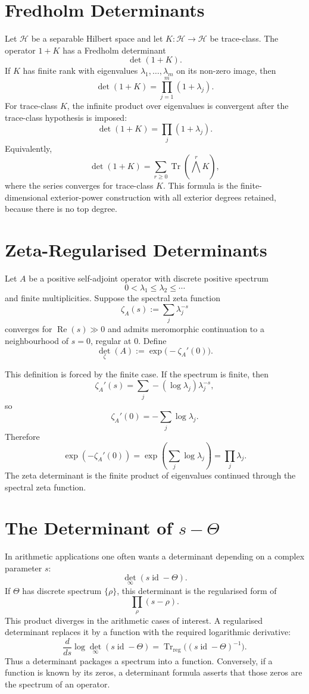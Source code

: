 \documentclass[11pt]{memoir}
\providecommand{\Tr}{\operatorname{Tr}}
\providecommand{\id}{\operatorname{id}}
\providecommand{\cH}{\mathcal{H}}
\begin{document}
\section{Fredholm Determinants}
\label{sec:fredholm}

Let \(\cH\) be a separable Hilbert space and let \(K:\cH\to\cH\) be
trace-class. The operator \(1+K\) has a Fredholm determinant
\[
  \det(1+K).
\]
If \(K\) has finite rank with eigenvalues \(\lambda_1,\dots,\lambda_m\)
on its non-zero image, then
\[
  \det(1+K)=\prod_{j=1}^{m}(1+\lambda_j).
\]
For trace-class \(K\), the infinite product over eigenvalues is
convergent after the trace-class hypothesis is imposed:
\[
  \det(1+K)=\prod_j(1+\lambda_j).
\]
Equivalently,
\[
  \det(1+K)
  =
  \sum_{r\geq0}\Tr\left(\bigwedge^rK\right),
\]
where the series converges for trace-class \(K\). This formula is the
finite-dimensional exterior-power construction with all exterior
degrees retained, because there is no top degree.

\section{Zeta-Regularised Determinants}
\label{sec:zeta-det}

Let \(A\) be a positive self-adjoint operator with discrete positive
spectrum
\[
  0<\lambda_1\leq\lambda_2\leq\cdots
\]
and finite multiplicities. Suppose the spectral zeta function
\[
  \zeta_A(s):=\sum_j\lambda_j^{-s}
\]
converges for \(\operatorname{Re}(s)\gg0\) and admits meromorphic
continuation to a neighbourhood of \(s=0\), regular at \(0\). Define
\[
  \det_\zeta(A):=\exp\bigl(-\zeta_A'(0)\bigr).
\]

This definition is forced by the finite case. If the spectrum is
finite, then
\[
  \zeta_A'(s)=\sum_j -(\log\lambda_j)\lambda_j^{-s},
\]
so
\[
  \zeta_A'(0)=-\sum_j\log\lambda_j.
\]
Therefore
\[
  \exp(-\zeta_A'(0))
  =
  \exp\left(\sum_j\log\lambda_j\right)
  =
  \prod_j\lambda_j.
\]
The zeta determinant is the finite product of eigenvalues continued
through the spectral zeta function.

\section{\texorpdfstring{The Determinant of \(s-\Theta\)}{The Determinant of s-Theta}}
\label{sec:s-minus-theta}

In arithmetic applications one often wants a determinant depending on
a complex parameter \(s\):
\[
  \det_\infty(s\id-\Theta).
\]
If \(\Theta\) has discrete spectrum \(\{\rho\}\), this determinant is
the regularised form of
\[
  \prod_\rho(s-\rho).
\]
This product diverges in the arithmetic cases of interest. A
regularised determinant replaces it by a function with the required
logarithmic derivative:
\[
  \frac{d}{ds}\log\det_\infty(s\id-\Theta)
  =
  \Tr_{\mathrm{reg}}\bigl((s\id-\Theta)^{-1}\bigr).
\]
Thus a determinant packages a spectrum into a function. Conversely,
if a function is known by its zeros, a determinant formula asserts
that those zeros are the spectrum of an operator.
\end{document}

